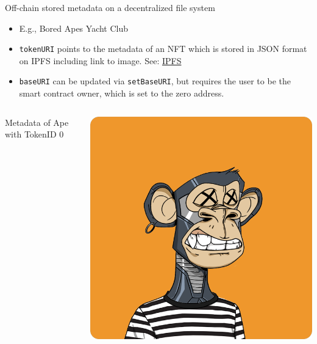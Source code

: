 \documentclass[handout]{beamer}
\begin{document}
\begin{frame}{Off-chain stored metadata on a decentralized file system}
	\begin{itemize}
		\item E.g., Bored Apes Yacht Club
		\item \texttt{tokenURI} points to the metadata of an NFT which is stored in JSON format on IPFS including link to image. See: \link \href{ipfs://QmeSjSinHpPnmXmspMjwiXyN6zS4E9zccariGR3jxcaWtq/1}{IPFS}
		\item \texttt{baseURI} can be updated via \texttt{setBaseURI}, but requires the user to be the smart contract owner, which is set to the zero address.
	\end{itemize} 
	\begin{columns}[T]
		\begin{column}{0.67\textwidth}
		\vspace{-1em}
			\begin{samplecode}{Metadata of Ape with TokenID 0}
				
			\end{samplecode}		
		\end{column} %
		\begin{column}{0.35\textwidth}
			\centering
			\includegraphics[scale=0.18]{../assets/images/ape_0.png}
		\end{column}
	\end{columns}
\end{frame}
\end{document}
